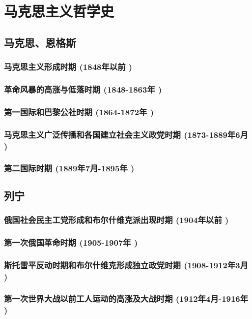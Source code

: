 \documentclass[UTF8]{../RepresentationUniverse}
\begin{document}
\section{马克思主义哲学史}





\subsection{马克思、恩格斯}
    \subsubsection{马克思主义形成时期 (1848年以前 )}
    \subsubsection{革命风暴的高涨与低落时期 (1848-1863年 )}
    \subsubsection{第一国际和巴黎公社时期 (1864-1872年 )}
    \subsubsection{马克思主义广泛传播和各国建立社会主义政党时期 (1873-1889年6月 )}
    \subsubsection{第二国际时期 (1889年7月-1895年 )}




\subsection{列宁}
    \subsubsection{俄国社会民主工党形成和布尔什维克派出现时期 (1904年以前 )}
    \subsubsection{第一次俄国革命时期 (1905-1907年 )}
    \subsubsection{斯托雷平反动时期和布尔什维克形成独立政党时期 (1908-1912年3月 )}
    \subsubsection{第一次世界大战以前工人运动的高涨及大战时期 (1912年4月-1916年 )}
\end{document}
